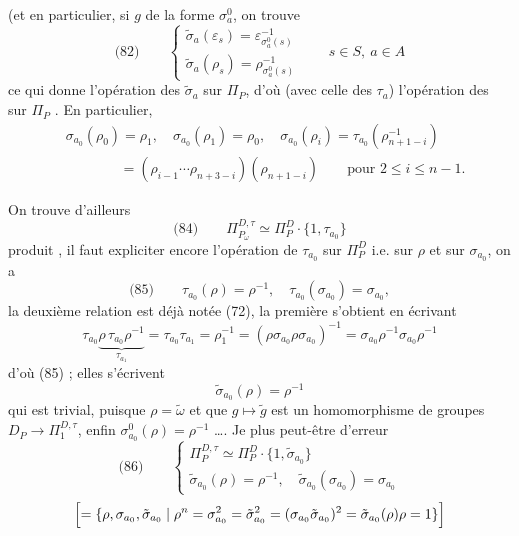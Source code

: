 \documentclass[11pt,a4paper]{article}
\begin{document}
(et en particulier, si $g$ de la forme $\sigma_a^0$, on trouve
\[
  \text{(82)}\qquad
  \begin{cases}
    \tilde\sigma_a(\varepsilon_s) = \varepsilon_{\sigma_a^0(s)}^{-1} \\
    \tilde\sigma_a(\rho_s) = \rho_{\sigma_a^0(s)}^{-1}
  \end{cases}
  \qquad s \in S,\ a \in A
\]
ce qui donne l'opération des $\tilde\sigma_a$ sur $\Pi_P$, \struck{\ill{}} d'où  \struck{\ill{}} (avec celle des $\tau_a$) l'opération des \ill{} sur $\Pi_P$ . En particulier,
\[
  \begin{aligned}
    &\sigma_{a_0}(\rho_0) = \rho_1, \quad \sigma_{a_0}(\rho_1) = \rho_0, \quad
    \sigma_{a_0}(\rho_i) = \tau_{a_0}(\rho_{n+1-i}^{-1}) \\
    &\phantom{\sigma_{a_0}(\rho_i)} = (\rho_{i-1}\cdots\rho_{n+3-i})(\rho_{n+1-i}) \qquad \text{pour } 2 \leq i \leq n-1 .
  \end{aligned}
\]

 On trouve d'ailleurs 
\[
  \text{(84)}\qquad \Pi_{P_\omega}^{D,\tau} \simeq \Pi_P^D \cdot \{1, \tau_{a_0}\}
\]
produit , il faut expliciter encore l'opération de $\tau_{a_0}$ sur $\Pi_P^D$ i.e. sur $\rho$ et sur $\sigma_{a_0}$, on a
\[
  \text{(85)}\qquad \tau_{a_0}(\rho) = \rho^{-1}, \quad \tau_{a_0}(\sigma_{a_0}) = \sigma_{a_0} ,
\]
la deuxième relation est déjà notée (72), la première s'obtient en écrivant
\[
  \tau_{a_0}\underbrace{\rho\,\tau_{a_0}\rho^{-1}}_{\tau_{a_1}} = \tau_{a_0}\tau_{a_1} = \rho_1^{-1}
  = (\rho\sigma_{a_0}\rho\sigma_{a_0})^{-1} = \sigma_{a_0}\rho^{-1}\sigma_{a_0}\rho^{-1}
\]
d'où (85) ;   elles s'écrivent
\[
  \tilde\sigma_{a_0}(\rho) = \rho^{-1}
\]
qui est trivial, puisque  $\rho = \tilde\omega$ \struck{\ill{}} et que $g \mapsto \tilde g$ est un homomorphisme de groupes $D_P \to \Pi_1^{D,\tau}$, enfin $\sigma_{a_0}^0(\rho) = \rho^{-1}$ …. Je \ill{} plus \ill{} peut-être d'erreur
\[
  \text{(86)}\qquad
  \begin{cases}
    \Pi_P^{D,\tau} \simeq \Pi_P^D \cdot \{1, \tilde\sigma_{a_0}\} \\
    \tilde\sigma_{a_0}(\rho) = \rho^{-1}, \quad \tilde\sigma_{a_0}(\sigma_{a_0}) = \sigma_{a_0}
  \end{cases}
\]
\[
  \Bigl[ = \{\rho, \sigma_{a_0}, \tilde\sigma_{a_0} \mid \rho^n = \sigma_{a_0}^2 = \tilde\sigma_{a_0}^2 = (\sigma_{a_0}\tilde\sigma_{a_0})^2 = \tilde\sigma_{a_0}(\rho)\rho = 1\} \Bigr]
\]
\end{document}
